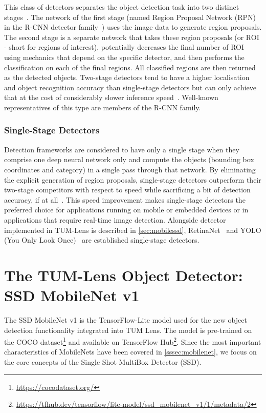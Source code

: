 \documentclass[
			   fontsize=11pt,
               paper=a4,
               bibliography=totoc,
               idxtotoc,
               headsepline,
               footsepline,
               footinclude=false,
               BCOR=12mm,
               DIV=13,
               openany,   %
               ]
               {scrbook}
\begin{document}
This class of detectors separates the object detection task into two distinct stages~\cite{12stageSYNASC2018}. The network of the first stage (named Region Proposal Network (RPN) in the R-CNN detector family~\cite{detectorRCNN}) uses the image data to generate region proposals. The second stage is a separate network that takes these region proposals (or ROI - short for regions of interest), potentially decreases the final number of ROI using mechanics that depend on the specific detector, and then performs the classification on each of the final regions. All classified regions are then returned as the detected objects. Two-stage detectors tend to have a higher localisation and object recognition accuracy than single-stage detectors but can only achieve that at the cost of considerably slower inference speed~\cite{surveyICBDT2019}. Well-known representatives of this type are members of the R-CNN family.

\subsubsection{Single-Stage Detectors}

Detection frameworks are considered to have only a single stage when they comprise one deep neural network only and compute the objects (bounding box coordinates and category) in a single pass through that network. By eliminating the explicit generation of region proposals, single-stage detectors outperform their two-stage competitors with respect to speed while sacrificing a bit of detection accuracy, if at all~\cite{detectorSSD}. 
This speed improvement makes single-stage detectors the preferred choice for applications running on mobile or embedded devices or in applications that require real-time image detection. Alongside detector implemented in TUM-Lens is described in \autoref{sec:mobilessd}, RetinaNet~\cite{detectorRetinaNet} and YOLO (You Only Look Once)~\cite{detectorYOLOv4} are established single-stage detectors.


\section{The TUM-Lens Object Detector: SSD MobileNet v1} \label{sec:mobilessd}

The SSD MobileNet v1 is the TensorFlow-Lite model used for the new object detection functionality integrated into TUM Lens. The model is pre-trained on the COCO dataset\footnote{\url{https://cocodataset.org/}} and available on TensorFlow Hub\footnote{\url{https://tfhub.dev/tensorflow/lite-model/ssd_mobilenet_v1/1/metadata/2}}. Since the most important characteristics of MobileNets have been covered in \autoref{sssec:mobilenet}, we focus on the core concepts of the Single Shot MultiBox Detector (SSD).
\end{document}
